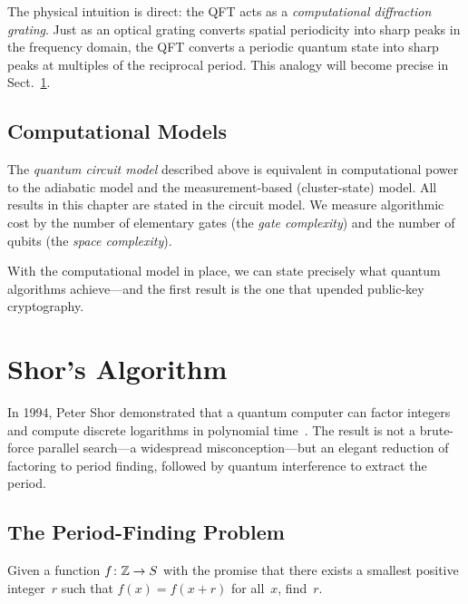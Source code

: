 The physical intuition is direct: the QFT acts as a \emph{computational diffraction grating}.  Just as an optical grating converts spatial periodicity into sharp peaks in the frequency domain, the QFT converts a periodic quantum state into sharp peaks at multiples of the reciprocal period.  This analogy will become precise in Sect.~\ref{sec:shor}.


\subsection{Computational Models}
\label{subsec:comp-models}

The \emph{quantum circuit model} described above is equivalent in computational power to the adiabatic model and the measurement-based (cluster-state) model.  All results in this chapter are stated in the circuit model.  We measure algorithmic cost by the number of elementary gates (the \emph{gate complexity}) and the number of qubits (the \emph{space complexity}).

With the computational model in place, we can state precisely what quantum algorithms achieve---and the first result is the one that upended public-key cryptography.


\section{Shor's Algorithm}
\label{sec:shor}

In 1994, Peter Shor demonstrated that a quantum computer can factor integers and compute discrete logarithms in polynomial time~\cite{Shor1994,Shor1997}.  The result is not a brute-force parallel search---a widespread misconception---but an elegant reduction of factoring to period finding, followed by quantum interference to extract the period.

\subsection{The Period-Finding Problem}
\label{subsec:period-finding}

\begin{definition}
\label{def:period-finding}
Given a function $f\colon \mathbb{Z} \to S$ with the promise that there exists a smallest positive integer~$r$ such that $f(x) = f(x + r)$ for all~$x$, find~$r$.
\end{definition}

